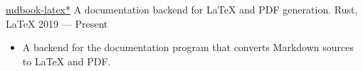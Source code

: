 \showoff
{\textcolor{my-blue}{\href{https://liambeckman.com/mdbook-latex}{mdbook-latex\textcolor{my-red}{*}}}}
{A documentation backend for \LaTeX{} and PDF generation.}
{Rust, \LaTeX{}}
{2019 --- Present}

\begin{itemize}[label=$\triangleright$]
    \item A backend for the  documentation program that converts Markdown sources to \LaTeX{} and PDF.
\end{itemize}

